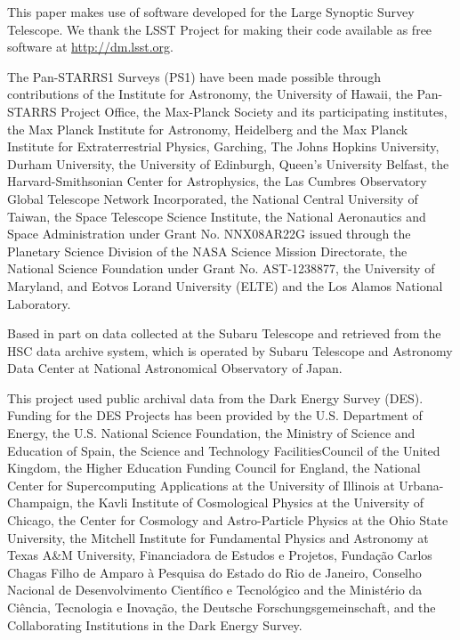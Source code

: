 \documentclass[a4paper,11pt]{article}
\begin{document}
    This paper makes use of software developed for the Large Synoptic Survey Telescope. We thank the LSST Project for making their code available as free software at \url{http://dm.lsst.org}.
    
    The Pan-STARRS1 Surveys (PS1) have been made possible through contributions of the Institute for Astronomy, the University of Hawaii, the Pan-STARRS Project Office, the Max-Planck Society and its participating institutes, the Max Planck Institute for Astronomy, Heidelberg and the Max Planck Institute for Extraterrestrial Physics, Garching, The Johns Hopkins University, Durham University, the University of Edinburgh, Queen’s University Belfast, the Harvard-Smithsonian Center for Astrophysics, the Las Cumbres Observatory Global Telescope Network Incorporated, the National Central University of Taiwan, the Space Telescope Science Institute, the National Aeronautics and Space Administration under Grant No. NNX08AR22G issued through the Planetary Science Division of the NASA Science Mission Directorate, the National Science Foundation under Grant No. AST-1238877, the University of Maryland, and Eotvos Lorand University (ELTE) and the Los Alamos National Laboratory.
    
    Based in part on data collected at the Subaru Telescope and retrieved from the HSC data archive system, which is operated by Subaru Telescope and Astronomy Data Center at National Astronomical Observatory of Japan.

    This project used public archival data from the Dark Energy Survey (DES). Funding for the DES Projects has been provided by the U.S. Department of Energy, the U.S. National Science Foundation, the Ministry of Science and Education of Spain, the Science and Technology FacilitiesCouncil of the United Kingdom, the Higher Education Funding Council for England, the National Center for Supercomputing Applications at the University of Illinois at Urbana-Champaign, the Kavli Institute of Cosmological Physics at the University of Chicago, the Center for Cosmology and Astro-Particle Physics at the Ohio State University, the Mitchell Institute for Fundamental Physics and Astronomy at Texas A\&M University, Financiadora de Estudos e Projetos, Funda{\c c}{\~a}o Carlos Chagas Filho de Amparo {\`a} Pesquisa do Estado do Rio de Janeiro, Conselho Nacional de Desenvolvimento Cient{\'i}fico e Tecnol{\'o}gico and the Minist{\'e}rio da Ci{\^e}ncia, Tecnologia e Inova{\c c}{\~a}o, the Deutsche Forschungsgemeinschaft, and the Collaborating Institutions in the Dark Energy Survey.
    
\end{document}
